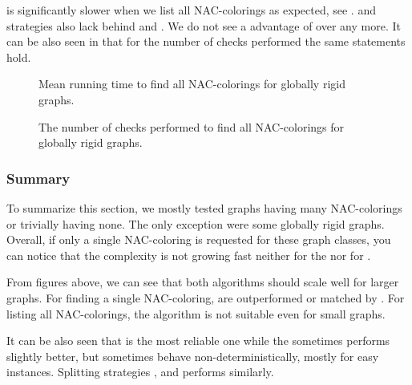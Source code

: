\NaiveCycles{} is significantly slower when we list all NAC-colorings
as expected, see .
\None{} and \CycleMask{} strategies also lack behind \Neighbors{} and \NeighborsDegree{}.
We do not see a advantage of \MergeLinear{} over \SharedVertices{} any more.
%
It can be also seen in 
that for the number of checks performed the same statements hold.
%
\begin{figure}[thbp]
	\centering
	\scalebox{\BenchFigureScale}{}
	\caption[Mean runtime for globally rigid graphs (all).]{
		Mean running time to find all NAC-colorings for globally rigid graphs.}%
	\label{fig:graph_globally_rigid_all_runtime}
\end{figure}%
\begin{figure}[thbp]
	\centering
	\scalebox{\BenchFigureScale}{}
	\caption[Checks performed for globally rigid graphs (all).]{
		The number of checks performed to find all NAC-colorings for globally rigid graphs.}%
	\label{fig:graph_globally_rigid_all_checks}
\end{figure}%



\subsubsection*{Summary}

To summarize this section, we mostly tested graphs having many NAC-colorings
or trivially having none.
The only exception were some globally rigid graphs.
%
Overall, if only a single NAC-coloring is requested
for these graph classes, you can notice that the complexity
is not growing fast neither for the \NaiveCycles{} nor for \Subgraphs{}.

From figures above, we can see that both algorithms should scale well for larger graphs.
For finding a single NAC-coloring, \Subgraphs{} are outperformed or matched by \NaiveCycles{}.
For listing all NAC-colorings, the \NaiveCycles{} algorithm
is not suitable even for small graphs.

It can be also seen that \MergeLinear{} is the most reliable one
while the \SharedVertices{} sometimes performs slightly better,
but sometimes behave non-deterministically, mostly for easy instances.
%
Splitting strategies \None{}, \Neighbors{} and \NeighborsDegree{}
performs similarly.


